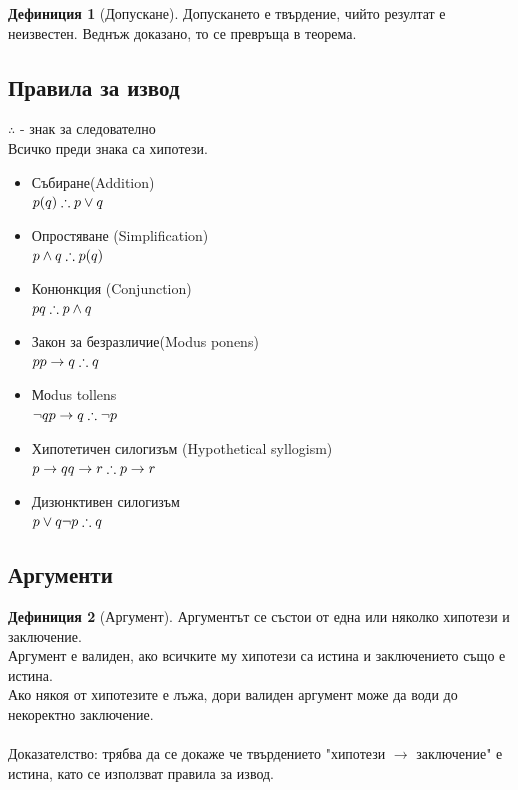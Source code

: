 \documentclass[fleqn, 12pt]{article}
\theoremstyle{definition}
\newtheorem{definition}{Дефиниция}[subsection]
\begin{document}
\begin{definition}[Допускане]
Допускането е твърдение, чийто резултат е неизвестен. Веднъж доказано, то се превръща в теорема. 
\end{definition}

\subsection{Правила за извод}
$\therefore$ - знак за следователно\\
Всичко преди знака са хипотези. 
\begin{itemize}
	\item Събиране(Addition) \\ $p (q) \\ \therefore p\lor q$
	\item Опростяване (Simplification) \\$p\land q \\ \therefore p(q)$
	\item Конюнкция (Conjunction) \\$p \\ q\\ \therefore p\land q$
	\item Закон за безразличие(Modus ponens) \\ $p \\ p \rightarrow q \\ \therefore q$
	\item Моdus tollens \\$\neg q \\ p \rightarrow q \\ \therefore \neg p$
	\item Хипотетичен силогизъм (Hypothetical syllogism) \\$ p \rightarrow q \\ q \rightarrow r \\ \therefore p \rightarrow r $
	\item Дизюнктивен силогизъм \\ $p\lor q \\ \neg p \\ \therefore q$
\end{itemize}

\subsection{Аргументи}

\begin{definition}[Аргумент]
Аргументът се състои от една или няколко хипотези и заключение. \\
Аргумент е валиден, ако всичките му хипотези са истина и заключението също е истина. \\
Ако някоя от хипотезите е лъжа, дори валиден аргумент може да води до некоректно заключение. \\
\\
Доказателство: трябва да се докаже че твърдението "хипотези $\rightarrow$ заключение" е истина, като се използват правила за извод. 
\end{definition}
\end{document}

